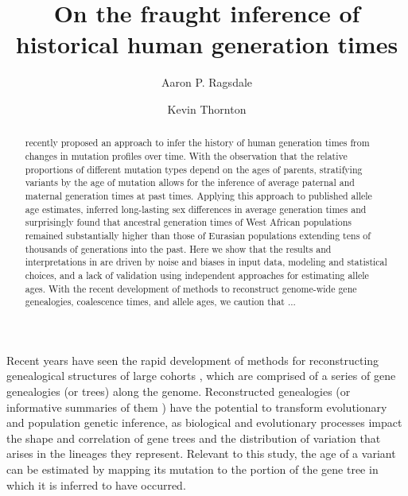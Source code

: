 \documentclass[]{article}
\begin{document}
\title{On the fraught inference of historical human generation times}
\author[1,*]{Aaron P. Ragsdale}
\author[2]{Kevin Thornton}
\maketitle

\begin{abstract}

    \noindent \citet{wang2023human} recently proposed an approach to infer the
    history of human generation times from changes in mutation profiles over
    time. With the observation that the relative proportions of different
    mutation types depend on the ages of parents, stratifying variants by the
    age of mutation allows for the inference of average paternal and maternal
    generation times at past times. Applying this approach to published allele
    age estimates, \citeauthor{wang2023human} inferred long-lasting sex
    differences in average generation times and surprisingly found that
    ancestral generation times of West African populations remained
    substantially higher than those of Eurasian populations extending tens of
    thousands of generations into the past. Here we show that the results and
    interpretations in \citet{wang2023human} are driven by noise and biases in
    input data, modeling and statistical choices, and a lack of validation
    using independent approaches for estimating allele ages. With the recent
    development of methods to reconstruct genome-wide gene genealogies,
    coalescence times, and allele ages, we caution that ...

\end{abstract}

Recent years have seen the rapid development of methods for reconstructing
genealogical structures of large cohorts
\citep{speidel2019method,wohns2022unified,hubisz2020mapping}, which are
comprised of a series of gene genealogies (or trees) along the genome.
Reconstructed genealogies (or informative summaries of them
\citep{albers2020dating}) have the potential to transform evolutionary and
population genetic inference, as biological and evolutionary processes impact
the shape and correlation of gene trees and the distribution of variation that
arises in the lineages they represent. Relevant to this study, the age of a
variant can be estimated by mapping its mutation to the portion of the gene
tree in which it is inferred to have occurred.
\end{document}

